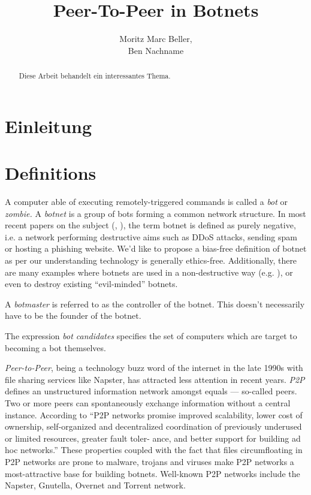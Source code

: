 \documentclass{llncs}
\title{Peer-To-Peer in Botnets}
\author{Moritz Marc Beller,\\Ben Nachname}
\institute{%
   Fakultät für Informatik, \\
   Technische Universität München \\
   \email{\{beller,bennachname\}@in.tum.de}
}
\begin{document}
\maketitle

\begin{abstract}
Diese Arbeit behandelt ein interessantes Thema.
\end{abstract}

\section{Einleitung}



\section{Definitions}
A computer able of executing remotely-triggered commands is called a {\it bot} or {\it zombie.} A {\it botnet} is a group of bots forming a common network structure.\cite{schoof2007detecting} In most recent papers on the subject (\cite{wang2009systematic}, \cite{abu2006multifaceted}), the term botnet is defined as purely negative, i.e. a network performing destructive aims such as DDoS attacks, sending spam or hosting a phishing website\cite{steggink2007detection}. We'd like to propose a bias-free definition of botnet as per our understanding technology is generally ethics-free. Additionally, there are many examples where botnets are used in a non-destructive way (e.g. \cite{seti}), or even to destroy existing ``evil-minded'' botnets.

A {\it botmaster} is referred to as the controller of the botnet. This doesn't necessarily have to be the founder of the botnet.

The expression {\it bot candidates} specifies the set of computers
which are target to becoming a bot themselves.

{\it Peer-to-Peer}, being a technology buzz word of the internet in
the late 1990s with file sharing services like Napster\cite{napster},
has attracted less attention in recent years. {\it P2P } defines an
unstructured information network amongst equals --- so-called
peers. Two or more peers can spontaneously exchange information
without a central instance. According to \cite{schoder2005core} ``P2P
networks promise improved scalability, lower cost of ownership,
self-organized and decentralized coordination of previously underused
or limited resources, greater fault toler- ance, and better support
for building ad hoc networks.''  These properties coupled with the
fact that files circumfloating in P2P networks are prone to malware,
trojans and viruses make P2P networks a most-attractive base for
building botnets.  Well-known P2P networks include the
Napster\cite{napster}, Gnutella, Overnet and Torrent network.
\end{document}
